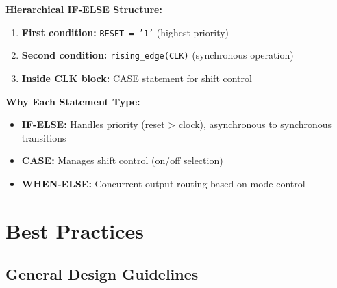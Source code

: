 \documentclass[12pt,a4paper]{article}
\begin{document}
\textbf{Hierarchical IF-ELSE Structure:}
\begin{enumerate}
    \item \textbf{First condition:} \texttt{RESET = '1'} (highest priority)
    \item \textbf{Second condition:} \texttt{rising\_edge(CLK)} (synchronous operation)
    \item \textbf{Inside CLK block:} CASE statement for shift control
\end{enumerate}

\textbf{Why Each Statement Type:}
\begin{itemize}
    \item \textbf{IF-ELSE:} Handles priority (reset > clock), asynchronous to synchronous transitions
    \item \textbf{CASE:} Manages shift control (on/off selection)
    \item \textbf{WHEN-ELSE:} Concurrent output routing based on mode control
\end{itemize}

\newpage
\section{Best Practices}

\subsection{General Design Guidelines}
\end{document}
